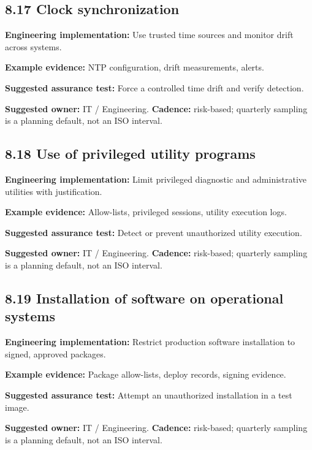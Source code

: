 \documentclass[11pt,letterpaper]{article}
\begin{document}
\subsection{8.17 Clock synchronization}
\textbf{Engineering implementation:} Use trusted time sources and monitor drift across systems.\par
\textbf{Example evidence:} NTP configuration, drift measurements, alerts.\par
\textbf{Suggested assurance test:} Force a controlled time drift and verify detection.\par
\textbf{Suggested owner:} IT / Engineering. \textbf{Cadence:} risk-based; quarterly sampling is a planning default, not an ISO interval.\par
{}
\subsection{8.18 Use of privileged utility programs}
\textbf{Engineering implementation:} Limit privileged diagnostic and administrative utilities with justification.\par
\textbf{Example evidence:} Allow-lists, privileged sessions, utility execution logs.\par
\textbf{Suggested assurance test:} Detect or prevent unauthorized utility execution.\par
\textbf{Suggested owner:} IT / Engineering. \textbf{Cadence:} risk-based; quarterly sampling is a planning default, not an ISO interval.\par
{}
\subsection{8.19 Installation of software on operational systems}
\textbf{Engineering implementation:} Restrict production software installation to signed, approved packages.\par
\textbf{Example evidence:} Package allow-lists, deploy records, signing evidence.\par
\textbf{Suggested assurance test:} Attempt an unauthorized installation in a test image.\par
\textbf{Suggested owner:} IT / Engineering. \textbf{Cadence:} risk-based; quarterly sampling is a planning default, not an ISO interval.\par
{}
\end{document}
